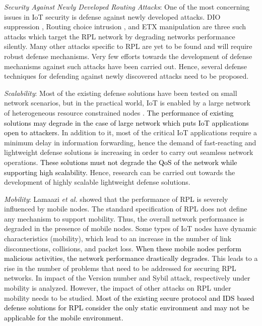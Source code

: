 \documentclass[10pt,journal,sort & compress]{IEEEtran}
\begin{document}
\textit{Security Against Newly Developed Routing Attacks}: One of the most concerning issues in IoT security is defense against newly developed attacks. DIO suppression \cite{Perazzo2017}, Routing choice intrusion \cite{zhang2015intrusion}, and ETX manipulation \cite{Shreenivas2017} are three such attacks which target the RPL network by degrading networks performance silently. Many other attacks specific to RPL are yet to be found and will require robust defense mechanisms. Very few efforts towards the development of defense mechanisms against such attacks have been carried out. Hence, several defense techniques for defending against newly discovered attacks need to be proposed. 

\textit{Scalability}: Most of the existing defense solutions have been tested on small network scenarios, but in the practical world, IoT is enabled by a large network of heterogeneous resource constrained nodes \cite{Dvir2011,khan2013wormhole, zhang2015intrusion,lai2016detection}. \textcolor{black}{The performance of existing solutions may degrade in the case of large network which puts IoT applications open to attackers.} In addition to it, most of the critical IoT applications require a minimum delay in information forwarding, hence the demand of fast-reacting and lightweight defense solutions is increasing in order to carry out seamless network operations. \textcolor{black}{These solutions must not degrade the QoS of the network while supporting high scalability.} Hence, research can be carried out towards the development of highly scalable lightweight defense solutions.

\textit{Mobility}: Lamaazi \textit{et al.} \cite{Lamaazi2016} showed that the performance of RPL is severely influenced by mobile nodes. The standard specification of RPL \cite{winter2012rpl} does not define any mechanism to support mobility. Thus, the overall network performance is degraded in the presence of mobile nodes. Some types of IoT nodes have dynamic characteristics (mobility), which lead to an increase in the number of link disconnections, collisions, and packet loss. \textcolor{black}{When these mobile nodes perform malicious activities, the network performance drastically degrades.} This leads to a rise in the number of problems that need to be addressed for securing RPL networks. In \cite{Aris2016, Medjek2015, Medjek2017} impact of the Version number and Sybil attack, respectively under mobility is analyzed. However, the impact of other attacks on RPL under mobility needs to be studied. \textcolor{black}{Most of the existing secure protocol and IDS based defense solutions for RPL consider the only static environment and may not be applicable for the mobile environment.}    
\end{document}
